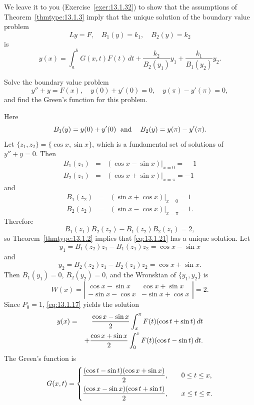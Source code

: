 We leave it to you (Exercise~\ref{exer:13.1.32}) to show that the assumptions of
Theorem~\ref{thmtype:13.1.3} imply that the unique solution of the boundary value problem
\[
  Ly=F,\quad B_{1}(y)=k_{1},\quad B_{2}(y)=k_{2}
\]
is
\[
  y(x)=\int_{a}^{b}G(x,t)F(t)\,dt+\frac{k_{2}}{B_{2}(y_{1})}y_{1}+ \frac{k_{1}}{B_{1}(y_{2})}y_{2}.
\]

\begin{example}
  \label{example:13.1.6}\rm Solve the boundary value problem
  \begin{equation}
    \label{eq:13.1.21}y''+y=F(x),\quad y(0)+y'(0)=0,\quad y(\pi)-y'(\pi)=0,
  \end{equation}
  and find the Green's function for this problem.
\end{example}

\begin{examplesolution}
\solution Here
\[
  B_{1}(y)=y(0)+y'(0)\text{\; and\; \; }B_{2}(y)=y(\pi)-y'(\pi).
\]
Let $\{z_{1},z_{2}\}=\{\cos x,\sin x\}$, which is a fundamental set of solutions of $y''+y=0$. Then
\begin{eqnarray*}
  B_{1}(z_{1}) & = & (\cos x-\sin x)\big|_{x=0}=\phantom{-}1 \\
  B_{2}(z_{1}) & = & (\cos x+\sin x)\big|_{x=\pi}=-1
\end{eqnarray*}
and
\begin{eqnarray*}
  B_{1}(z_{2}) & = & (\sin x+\cos x)\big|_{x=0}=1 \\
  B_{2}(z_{2}) & = & (\sin x-\cos x)\big|_{x=\pi}=1.
\end{eqnarray*}
Therefore
\[
  B_{1}(z_{1})B_{2}(z_{2})-B_{1}(z_{2})B_{2}(z_{1})=2,
\]
so Theorem~\ref{thmtype:13.1.2} implies that \eqref{eq:13.1.21} has a unique solution. Let
\[
  y_{1}=B_{1}(z_{2})z_{1}-B_{1}(z_{1})z_{2}=\cos x-\sin x
\]
and
\[
  y_{2}=B_{2}(z_{2})z_{1}-B_{2}(z_{1})z_{2}=\cos x+\sin x.
\]
Then $B_{1}(y_{1})=0$, $B_{2}(y_{2})=0$, and the Wronskian of $\{y_{1},y_{2}\}$ is
\[
  W(x)= \left|
  \begin{array}{rrccccc}
    \cos x-\sin x  & \cos x+\sin x  \\
    -\sin x-\cos x & -\sin x+\cos x
  \end{array}\right|=2.
\]
Since $P_{0}=1$, \eqref{eq:13.1.17} yields the solution
\begin{eqnarray*}
  y(x) & = & \displaystyle{\frac{\cos x-\sin x}{2}}\int_{x}^{\pi}F(t)(\cos t+\sin t)\,dt \\
       &   & +\displaystyle{\frac{\cos x+\sin x}{2}}\int_{0}^{x}F(t)(\cos t-\sin t)\,dt.
\end{eqnarray*}
The Green's function is
\[
  G(x,t)=
  \begin{cases}
    \displaystyle{\frac{(\cos t-\sin t)(\cos x+\sin x)}{2}}, & \quad0\le t\le x,   \\[.1in]
    \displaystyle{\frac{(\cos x-\sin x)(\cos t+\sin t)}{2}}, & \quad x\le t\le\pi.
  \end{cases}
\]
\end{examplesolution}

